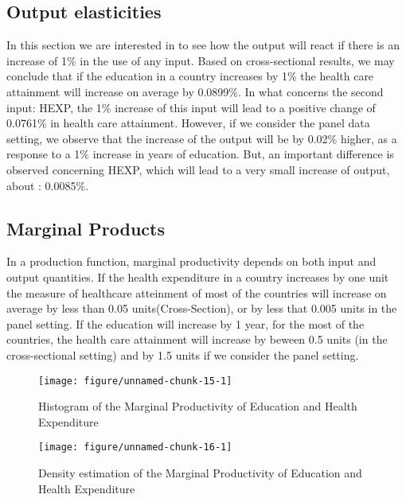 \documentclass[12pt,a4paper]{article}\usepackage[]{graphicx}\usepackage[]{color}
\makeatletter
\def\maxwidth{ %
  \ifdim\Gin@nat@width>\linewidth
    \linewidth
  \else
    \Gin@nat@width
  \fi
}
\newenvironment{knitrout}{}{} %
\makeatother
\begin{document}
\subsection{Output elasticities}
In this section we are interested in to see how the output will react if there is an increase of 1\% in the use of any input. Based on cross-sectional results, we may conclude that if the education in a country increases by 1\% the health care attainment will increase on average by 0.0899\%. In what concerns the second input: HEXP, the 1\% increase of this input will lead to a positive change of 0.0761\% in health care attainment. However, if we consider the panel data setting, we observe that the increase of the output will be by 0.02\% higher, as a response to a 1\% increase in years of education. But, an important difference is observed concerning HEXP, which will lead to a very small increase of output, about : 0.0085\%.

\subsection{Marginal Products}
In a production function, marginal productivity depends on both input and output quantities. If the health expenditure in a country increases  by one unit the measure of healthcare atteinment of most of the countries will increase on average by less than 0.05 units(Cross-Section), or by less that  0.005 units in the panel setting. If the education will increase by 1 year, for the most of the countries, the health care attainment will increase by beween 0.5 units (in the cross-sectional setting) and by 1.5 units if we consider the panel setting.
\begin{knitrout}
\color{fgcolor}\begin{figure}
\texttt{[image: figure/unnamed-chunk-15-1]} \caption[Histogram of the Marginal Productivity of Education and Health Expenditure]{Histogram of the Marginal Productivity of Education and Health Expenditure}\label{fig:unnamed-chunk-15}
\end{figure}


\end{knitrout}
\begin{knitrout}
\color{fgcolor}\begin{figure}
\texttt{[image: figure/unnamed-chunk-16-1]} \caption[Density estimation of the Marginal Productivity of Education and Health Expenditure]{Density estimation of the Marginal Productivity of Education and Health Expenditure}\label{fig:unnamed-chunk-16}
\end{figure}


\end{knitrout}
\end{document}
